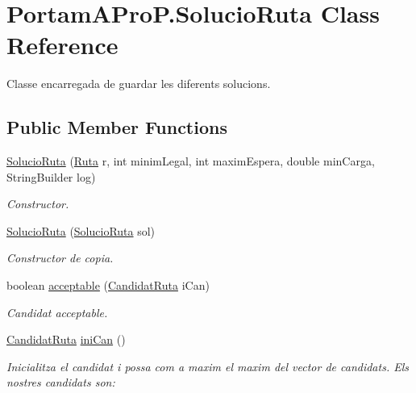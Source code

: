 \hypertarget{class_portam_a_pro_p_1_1_solucio_ruta}{}\section{Portam\+A\+Pro\+P.\+Solucio\+Ruta Class Reference}
\label{class_portam_a_pro_p_1_1_solucio_ruta}


Classe encarregada de guardar les diferents solucions.  


\subsection*{Public Member Functions}
\begin{DoxyCompactItemize}
\item 
\hyperlink{class_portam_a_pro_p_1_1_solucio_ruta_a8dfc53d75c5971b680d848d069e5d7c9}{Solucio\+Ruta} (\hyperlink{class_portam_a_pro_p_1_1_ruta}{Ruta} r, int minim\+Legal, int maxim\+Espera, double min\+Carga, String\+Builder log)
\begin{DoxyCompactList}\small\item\em Constructor. \end{DoxyCompactList}\item 
\hyperlink{class_portam_a_pro_p_1_1_solucio_ruta_ad5f03af52bc7e1016431322f939a6f92}{Solucio\+Ruta} (\hyperlink{class_portam_a_pro_p_1_1_solucio_ruta}{Solucio\+Ruta} sol)
\begin{DoxyCompactList}\small\item\em Constructor de copia. \end{DoxyCompactList}\item 
boolean \hyperlink{class_portam_a_pro_p_1_1_solucio_ruta_a63c5960d90ed9c344493ea0f8eed1498}{acceptable} (\hyperlink{class_portam_a_pro_p_1_1_candidat_ruta}{Candidat\+Ruta} i\+Can)
\begin{DoxyCompactList}\small\item\em Candidat acceptable. \end{DoxyCompactList}\item 
\mbox{\label{class_portam_a_pro_p_1_1_solucio_ruta_a771a301345beac91ba71452c7dd5d1bb}} 
\hyperlink{class_portam_a_pro_p_1_1_candidat_ruta}{Candidat\+Ruta} \hyperlink{class_portam_a_pro_p_1_1_solucio_ruta_a771a301345beac91ba71452c7dd5d1bb}{ini\+Can} ()
\begin{DoxyCompactList}\small\item\em Inicialitza el candidat i possa com a maxim el maxim del vector de candidats. Els nostres candidats son\+:~\newline

\end{DoxyCompactList}
\end{DoxyCompactItemize}
